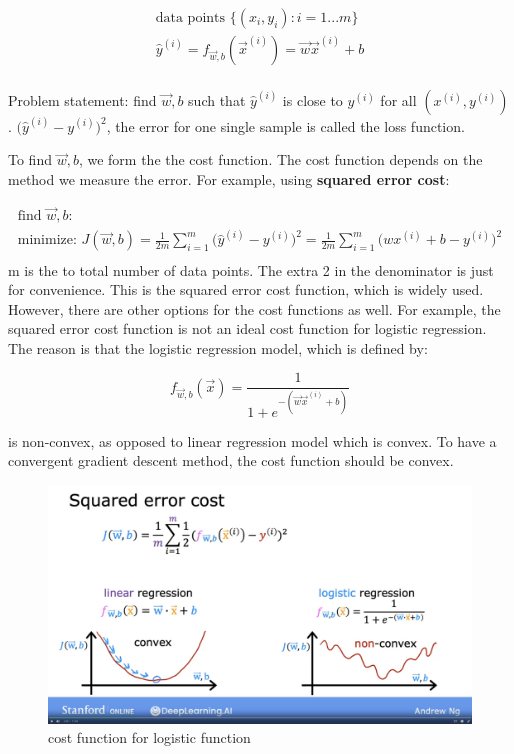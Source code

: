 \documentclass[12pt]{report}
\begin{document}
\begin{multline}
		\text{data points } \{(x_i, y_i): i=1 ... m \} \\
    \hat{y}^{(i)} = f_{\overrightarrow{w},b} (\overrightarrow{x}^{(i)})  = \overrightarrow{w} \overrightarrow{x} ^ {(i)} + b \\
\end{multline}

Problem statement: find $\overrightarrow{w},b$ such that $\hat{y}^{(i)}$ is close to $y^{(i)}$ for all $(x^{(i)}, y^{(i)} )$. $\big(\hat{y}^{(i)}  - y^{(i)} \big) ^2$, the error for one single sample is called the loss function.

To find $\overrightarrow{w},b$, we form the the cost function. The cost function depends on the method we measure the error. For example, using \textbf{squared error cost}:

\begin{multline}
	\text{find $\overrightarrow{w},b$:} \\
	\text{minimize:  }  J(\overrightarrow{w},b) = \frac{1}{2m} \sum_{i=1}^{m} \big(\hat{y}^{(i)}  - y^{(i)} \big) ^2 = \frac{1}{2m} \sum_{i=1}^{m} \big( wx ^ {(i)} + b - y^{(i)} \big) ^2 \\
\end{multline}
m is the to total number of data points. The extra 2 in the denominator is just for convenience. This is the squared error cost function, which is widely used. However, there are other options for the cost functions as well. For example, the squared error cost function is not an ideal cost function for logistic regression. The reason is that the logistic regression model, which is defined by:

\begin{equation}
  f_{\overrightarrow{w},b} (\overrightarrow{x}) = \frac{1}{1+e^{-(\overrightarrow{w} \overrightarrow{x} ^ {(i)} + b)}}
\end{equation}

is non-convex, as opposed to linear regression model which is convex. To have a convergent gradient descent method, the cost function should be convex.

\begin{figure}[htbp]
  \begin{center}
    \includegraphics[trim =0cm 6.0cm 0cm 20.0cm, clip, scale=0.15]{pics/logistic.png}
    \caption{cost function for logistic function}
  \end{center}
\end{figure}
\end{document}
